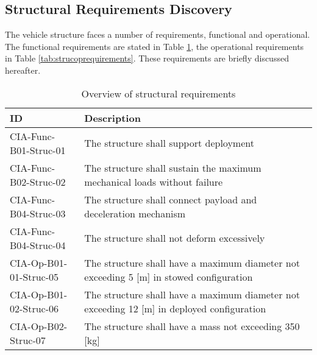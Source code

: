 \subsection{Structural Requirements Discovery} \label{sec:struct}
The vehicle structure faces a number of requirements, functional and operational. The functional requirements are stated in Table \ref{tab:strucfuncrequirements}, the operational requirements in Table \ref{tab:strucoprequirements}. These requirements are briefly discussed hereafter.
\begin{table}[H]
	\caption{Overview of structural requirements}
	\begin{tabular}{|p{}|p{}|}
    \hline
    ID          & Description                                                                                                      \\ \hline \hline
    CIA-Func-B01-Struc-01 & The structure shall support deployment \\ \hline
    CIA-Func-B02-Struc-02 & The structure shall sustain the maximum mechanical loads without failure                           \\ \hline
    CIA-Func-B04-Struc-03 & The structure shall connect payload and deceleration mechanism \\ \hline
    CIA-Func-B04-Struc-04 & The structure shall not deform excessively \\ \hline
    CIA-Op-B01-01-Struc-05 & The structure shall have a maximum diameter not exceeding 5 [m] in stowed configuration                              \\ \hline
    CIA-Op-B01-02-Struc-06 & The structure shall have a maximum diameter not exceeding 12 [m] in deployed configuration     \\ \hline
    CIA-Op-B02-Struc-07 & The structure shall have a mass not exceeding 350 [kg]\\ \hline
    \end{tabular}
    \label{tab:strucfuncrequirements}
\end{table}
